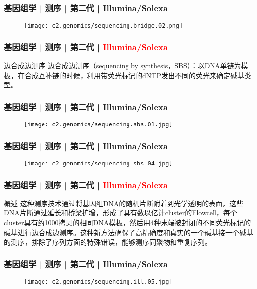 \begin{frame}
  \frametitle{基因组学 | 测序 | 第二代 | Illumina/Solexa}
  \begin{figure}
    \centering
    \texttt{[image: c2.genomics/sequencing.bridge.02.png]}
  \end{figure}
\end{frame}

\begin{frame}
  \frametitle{基因组学 | 测序 | 第二代 | \textcolor{red}{Illumina/Solexa}}
  \begin{block}{边合成边测序}
边合成边测序（sequencing by synthesis，SBS）：以DNA单链为模板，在合成互补链的时候，利用带荧光标记的dNTP发出不同的荧光来确定碱基类型。
  \end{block}
\end{frame}

\begin{frame}
  \frametitle{基因组学 | 测序 | 第二代 | Illumina/Solexa}
  \begin{figure}
    \centering
    \texttt{[image: c2.genomics/sequencing.sbs.01.jpg]}
  \end{figure}
\end{frame}

\begin{frame}
  \frametitle{基因组学 | 测序 | 第二代 | Illumina/Solexa}
  \begin{figure}
    \centering
    \texttt{[image: c2.genomics/sequencing.sbs.04.jpg]}
  \end{figure}
\end{frame}

\begin{frame}
  \frametitle{基因组学 | 测序 | 第二代 | \textcolor{red}{Illumina/Solexa}}
  \begin{block}{概述}
这种测序技术通过将基因组DNA的随机片断附着到光学透明的表面，这些DNA片断通过延长和桥梁扩增，形成了具有数以亿计cluster的Flowcell，每个cluster具有约1000拷贝的相同DNA模板，然后用4种末端被封闭的不同荧光标记的碱基进行边合成边测序。这种新方法确保了高精确度和真实的一个碱基接一个碱基的测序，排除了序列方面的特殊错误，能够测序同聚物和重复序列。
  \end{block}
\end{frame}

\begin{frame}
  \frametitle{基因组学 | 测序 | 第二代 | Illumina/Solexa}
  \begin{figure}
    \centering
    \texttt{[image: c2.genomics/sequencing.ill.05.jpg]}
  \end{figure}
\end{frame}

